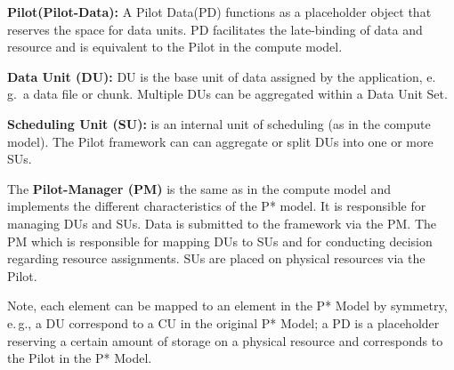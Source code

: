 \documentclass[conference,final]{IEEEtran}
\makeatletter
\def\reduwave{\bgroup \markoverwith{\lower3.5\p@\hbox{\sixly \textcolor{red}{\char58}}}\ULon}
\newcommand{\jwave}[1]{ {\reduwave{#1}}}
\newcommand{\jhanote}[1]{ {\textcolor{red} { ***shantenu: #1 }}}
\newcommand{\alnote}[1]{ {\textcolor{blue} { ***andreL: #1 }}}
\newcommand{\jwave}[1]{#1}
\newcommand{\alnote}[1]{}
\newcommand{\jhanote}[1]{}
\newcommand{\pilot}{Pilot\xspace}
\newcommand{\cu}{CU\xspace}
\newcommand{\cus}{CUs\xspace}
\newcommand{\dus}{DUs\xspace}
\newcommand{\pilotdata}{Pilot Data\xspace}
\newcommand{\pd}{PD\xspace}
\newcommand{\sus}{SUs\xspace}
\makeatother
\begin{document}
\begin{compactenum}[A.]

\item \textbf{\pilot (Pilot-Data):} A \pilotdata (\pd) functions as a 
	placeholder object that reserves the space
	for data units. PD facilitates the late-binding of data and resource and is
	equivalent to the \pilot in the compute model.

\item \textbf{Data Unit (DU):} DU is the base unit of data assigned by
  the application,  e.\,g.\ a data file or chunk. Multiple DUs can be aggregated 
   within a Data Unit Set.


\item \textbf{Scheduling Unit (SU):} is an internal unit of scheduling (as in 
the compute model). The Pilot framework can can aggregate or split DUs into one 
or more SUs.

\item The \textbf{Pilot-Manager (PM)} is the same as in the compute model and
implements the different characteristics of the P* model. It is responsible for
managing \dus and \sus. Data is submitted to the framework via the PM. The PM
which is responsible for mapping \dus to \sus and for conducting decision 
regarding resource assignments. \sus are placed on physical resources via the \pilot.
	
\end{compactenum}
 
Note, each element can be mapped to an element in the P* Model by
symmetry, e.\,g., a DU correspond to a \cu  in the original P* Model; 
a PD is a placeholder reserving a certain amount of storage on a physical 
resource and corresponds to the \pilot in the P* Model.


\end{document}

